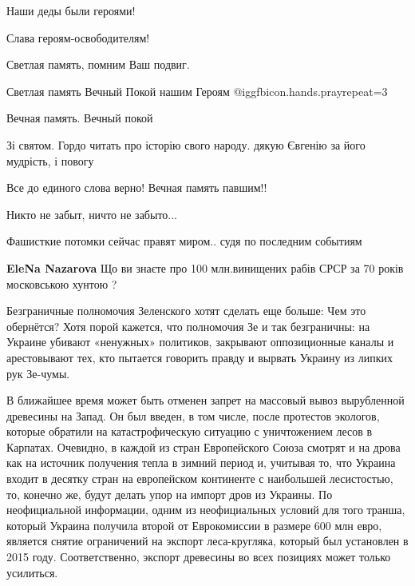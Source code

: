 \begin{itemize}
\begin{itemize}
\end{itemize} %

Наши деды были героями!

Слава героям-освободителям!

Светлая память, помним Ваш подвиг.

Светлая память Вечный Покой нашим Героям  @igg{fbicon.hands.pray}{repeat=3} 

Вечная память. Вечный покой

Зі святом. Гордо читать про історію свого народу. дякую Євгенію за його мудрість, і повогу

Все до единого слова верно! Вечная память павшим!!

Никто не забыт, ничто не забыто...

Фашисткие потомки сейчас правят миром.. судя по последним событиям

\begin{itemize} %
\textbf{EleNa Nazarova} Що ви знаєте про 100 млн.винищених рабів СРСР за 70 років московською хунтою ?
\end{itemize} %


Безграничные полномочия Зеленского хотят сделать еще больше: Чем это обернётся?
Хотя порой кажется, что полномочия Зе и так безграничны: на Украине убивают
«ненужных» политиков, закрывают оппозиционные каналы и арестовывают тех, кто
пытается говорить правду и вырвать Украину из липких рук Зе-чумы.


В ближайшее время может быть отменен запрет на массовый вывоз вырубленной
древесины на Запад. Он был введен, в том числе, после протестов экологов,
которые обратили на катастрофическую ситуацию с уничтожением лесов в Карпатах.
Очевидно, в каждой из стран Европейского Союза смотрят и на дрова как на
источник получения тепла в зимний период и, учитывая то, что Украина входит в
десятку стран на европейском континенте с наибольшей лесистостью, то, конечно
же, будут делать упор на импорт дров из Украины. По неофициальной информации,
одним из неофициальных условий для того транша, который Украина получила второй
от Еврокомиссии в размере 600 млн евро, является снятие ограничений на экспорт
леса-кругляка, который был установлен в 2015 году. Соответственно, экспорт
древесины во всех позициях может только усилиться.


\end{itemize}
